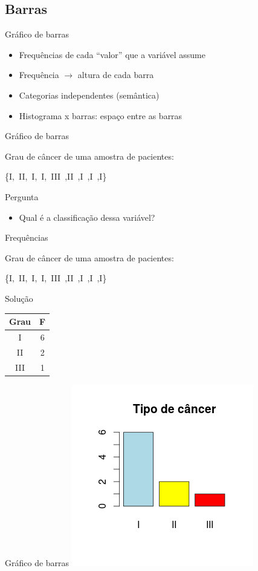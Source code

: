 \documentclass{beamer}
\begin{document}
\subsection{Barras}

\begin{frame}{Gráfico de barras}
  \begin{itemize}
  \item Frequências de cada ``valor'' que a variável assume
  \item Frequência $\rightarrow$ altura de cada barra
  \item Categorias independentes (semântica)
  \item Histograma x barras: \alert{espaço entre as barras}
  \end{itemize}
\end{frame}

\begin{frame}{Gráfico de barras}
  \begin{example}
    Grau de câncer de uma amostra de pacientes:

    \bigskip
    \centering\{I,\ II,\ I,\ I,\ III\ ,II\ ,I\ ,I\ ,I\}
  \end{example}
  \begin{block}{Pergunta}
    \begin{itemize}
    \item Qual é a classificação dessa variável?
    \end{itemize}
  \end{block}
\end{frame}

\begin{frame}{Frequências}
  \begin{example}
    Grau de câncer de uma amostra de pacientes:

    \bigskip
    \centering\{I,\ II,\ I,\ I,\ III\ ,II\ ,I\ ,I\ ,I\}
  \end{example}
  \begin{block}{Solução}
    \centering\begin{tabular}{|c|c|}
      \hline
      Grau & F\\
      \hline
      \hline
      I & 6\\
      \hline
      II & 2\\
      \hline
      III & 1\\
      \hline
    \end{tabular}
  \end{block}
\end{frame}

\begin{frame}{Gráfico de barras}
  \centering\includegraphics[height=\textheight]{Desc_I/barras}
\end{frame}
\end{document}

